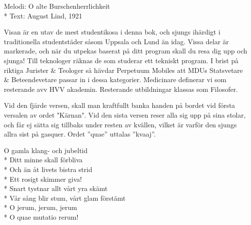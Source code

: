 \begin{SongText}
    \begin{SongInfo}
        Melodi: O alte Burschenherrlichkeit\\*
        Text: August Lind, 1921
    \end{SongInfo}
    \begin{SongInfo}
        Visan är en utav de mest studentikosa i denna bok, och sjungs ihärdigt i traditionella studentstäder såsom Uppsala och Lund än idag. 
        Vissa delar är markerade, och när du utpekas baserat på ditt program skall du resa dig upp och sjunga! 
        Till teknologer räknas de som studerar ett tekniskt program.
        I brist på riktiga Jurister \& Teologer så hävdar Perpetuum Mobiles att MDUs Statsvetare \& Beteendevetare passar in i dessa kategorier.
        Medicinare definerar vi som resterande avv HVV akademin. Resterande utbildningar klassas som Filosofer.

        Vid den fjärde versen, skall man kraftfullt banka handen på bordet vid första versalen av ordet "Kärnan". Vid den sista versen reser alla sig upp på sina stolar, och får ej sätta sig tillbaks under resten av kvällen, vilket är varför den sjungs allra sist på gasquer. Ordet ”quae” uttalas  ”kvaaj”.
    \end{SongInfo}
    \begin{SongVerse}
        O gamla klang- och jubeltid\\*
        Ditt minne skall förbliva\\*
        Och än åt livets bistra strid\\*
        Ett rosigt skimmer giva!\\*
        Snart tystnar allt vårt yra skämt\\*
        Vår sång blir stum, vårt glam förstämt\\*
        O jerum, jerum, jerum\\*
        O quae mutatio rerum!
    \end{SongVerse}

    


\end{SongText}
